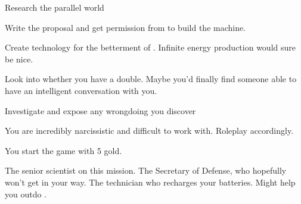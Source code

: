 \documentclass[char]{guildcamp3}
\begin{document}
\begin{itemz}[Goals]
  \item Research the parallel world
  \item Write the proposal and get permission from \cPoliOne{} to build the machine. 
  \item Create technology for the betterment of \bTechWorld{}. Infinite energy production would sure be nice. 
  \item Look into whether you have a double. Maybe you'd finally find someone able to have an intelligent conversation with you. 
  \item Investigate \cSciOne{} and expose any wrongdoing you discover
\end{itemz}

\begin{itemz}[Notes]
	\item You are incredibly narcissistic and difficult to work with. Roleplay accordingly.  
	\item You start the game with 5 gold. 
\end{itemz}


\begin{contacts}
  \contact{\cSciOne{}} The senior scientist on this mission.
  \contact{\cPoliOne{}} The Secretary of Defense, who hopefully won't get in your way.
  \contact{\cTech{}} The technician who recharges your batteries. Might help you outdo \cSciOne{}.
\end{contacts}
\end{document}
